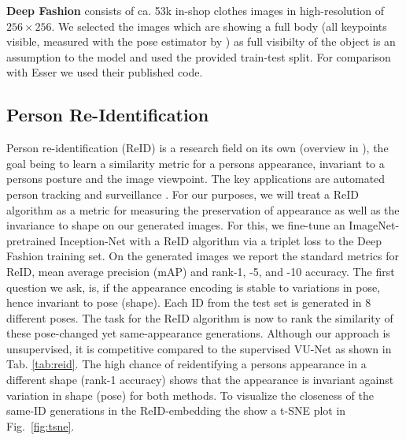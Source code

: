 		\begin{tcolorbox}
			\textbf{Deep Fashion} \cite{liu16deepfashion, liu16deepfashionwild} consists of ca. 53k in-shop clothes images in high-resolution of $256 \times 256$. We selected the images which are showing a full body (all keypoints visible, measured with the pose estimator by \cite{cao17affinityfield}) as full visibilty of the object is an assumption to the model and used the provided train-test split. For comparison with Esser \etal \cite{esser18} we used their published code.
		\end{tcolorbox}

	\subsection{Person Re-Identification}

		Person re-identification (ReID) is a research field on its own (overview in \eg \cite{almazan18reidtowards, bedagkar14reidtrends}), the goal being to learn a similarity metric for a persons appearance, invariant to a persons posture and the image viewpoint.
		The key applications are automated person tracking and surveillance \cite{zheng16reidfuture}.
		For our purposes, we will treat a ReID algorithm as a metric for measuring the preservation of appearance as well as the invariance to shape on our generated images.
		For this, we fine-tune an ImageNet-pretrained \cite{russakovsky15imagenet} Inception-Net \cite{szegedy15inception} with a ReID algorithm \cite{xiao17reidjoint} via a triplet loss \cite{hermans17reidtriplet} to the Deep Fashion training set.
		On the generated images we report the standard metrics for ReID, mean average precision (mAP) and rank-1, -5, and -10 accuracy.
		The first question we ask, is, if the appearance encoding is stable to variations in pose, hence invariant to pose (shape). Each ID from the test set is generated in 8 different poses. The task for the ReID algorithm is now to rank the similarity of these pose-changed yet same-appearance generations.
		Although our approach is unsupervised, it is competitive compared to the supervised VU-Net \cite{esser18} as shown in Tab. \ref{tab:reid}. The high chance of reidentifying a persons appearance in a different shape (rank-1 accuracy) shows that the appearance is invariant against variation in shape (pose) for both methods.
 		To visualize the closeness of the same-ID generations in the ReID-embedding the show a t-SNE plot in Fig.~\ref{fig:tsne}.

